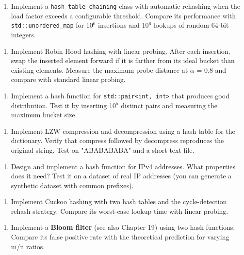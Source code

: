 \begin{enumerate}
\item Implement a \texttt{hash\_table\_chaining} class with automatic rehashing when the load factor exceeds a configurable threshold. Compare its performance with \texttt{std::unordered\_map} for 10$^{6}$ insertions and 10$^{6}$ lookups of random 64-bit integers.
\end{enumerate}

\begin{enumerate}
\item Implement Robin Hood hashing with linear probing. After each insertion, swap the inserted element forward if it is farther from its ideal bucket than existing elements. Measure the maximum probe distance at $\alpha $ = 0.8 and compare with standard linear probing.
\end{enumerate}

\begin{enumerate}
\item Implement a hash function for \texttt{std::pair<int, int>} that produces good distribution. Test it by inserting 10$^{5}$ distinct pairs and measuring the maximum bucket size.
\end{enumerate}

\begin{enumerate}
\item Implement LZW compression and decompression using a hash table for the dictionary. Verify that compress followed by decompress reproduces the original string. Test on "ABABABABA" and a short text file.
\end{enumerate}

\begin{enumerate}
\item Design and implement a hash function for IPv4 addresses. What properties does it need? Test it on a dataset of real IP addresses (you can generate a synthetic dataset with common prefixes).
\end{enumerate}

\begin{enumerate}
\item Implement Cuckoo hashing with two hash tables and the cycle-detection rehash strategy. Compare its worst-case lookup time with linear probing.
\end{enumerate}

\begin{enumerate}
\item Implement a \textbf{Bloom filter} (see also Chapter 19) using two hash functions. Compare its false positive rate with the theoretical prediction for varying m/n ratios.
\end{enumerate}

